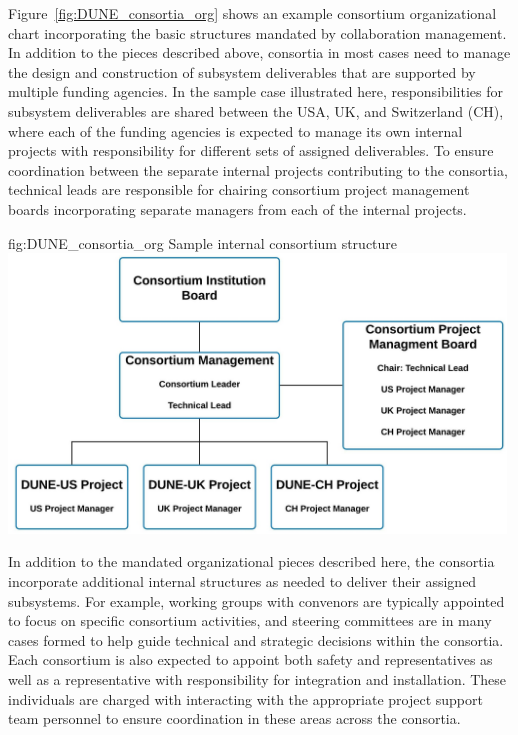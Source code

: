 Figure~\ref{fig:DUNE_consortia_org} shows an example consortium 
organizational chart incorporating the basic structures mandated 
by  collaboration management.  In addition to the pieces 
described above, consortia in most cases need to manage the design 
and construction of subsystem deliverables that are supported by 
multiple funding agencies.  In the sample case illustrated here, 
responsibilities for subsystem deliverables are shared between the 
USA, UK, and Switzerland (CH), where each of the funding agencies 
is expected to manage its own internal projects with responsibility 
for different sets of assigned deliverables.  To ensure coordination 
between the separate internal projects contributing to the consortia, 
technical leads are responsible for chairing consortium project 
management boards incorporating separate managers from each of 
the internal projects.   
\begin{dunefigure}{fig:DUNE_consortia_org}
  {Sample  internal consortium structure}
  \includegraphics[width=0.99\textwidth]{graphics/Internal_Consortia_OrgChart2}
\end{dunefigure}

In addition to the mandated organizational pieces described here, 
the consortia incorporate additional internal structures as needed 
to deliver their assigned subsystems.  For example, working groups 
with convenors are typically appointed to focus on specific consortium 
activities, and steering committees are in many cases formed to help 
guide technical and strategic decisions within the consortia.  Each 
consortium is also expected to appoint both safety and  
representatives as well as a representative with responsibility for 
integration and installation.  These individuals are charged 
with interacting  with the appropriate project support team 
personnel to ensure coordination in these areas across the consortia.        

